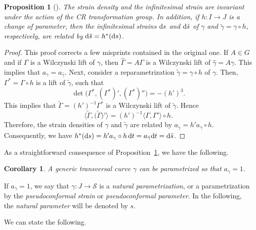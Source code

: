 \documentclass[pdftex]{sigma}
\numberwithin{equation}{section}
\newtheorem{Corollary}[Theorem]{Corollary}
\newtheorem{Proposition}[Theorem]{Proposition}
 { \theoremstyle{definition}
\newtheorem{Definition}[Theorem]{Definition}
\newtheorem{Note}[Theorem]{Note}
\newtheorem{Example}[Theorem]{Example}
\newtheorem{Remark}[Theorem]{Remark} }
\def\S{\mathcal{S}}
\def\S{\mathcal{S}}
\begin{document}
\begin{Proposition}[\cite{MNS-Kharkiv}]\label{2.2.1}
The strain density and the infinitesimal strain are invariant under the action of the CR transformation group.
In addition, if $h\colon I \to J$ is a change of parameter, then the infinitesimal strains ${\rm d}s$ and ${\rm d}\tilde s$
of $\gamma$ and $\tilde \gamma=\gamma\circ h$,
respectively, are related by ${\rm d}\tilde s = h^*({\rm d}s)$.
\end{Proposition}

\begin{proof}
This proof corrects a few misprints contained in the original one.
If $A\in {G}$ and if $\Gamma$ is a Wilczynski lift of $\gamma$, then $\hat{\Gamma} = A\Gamma$ is a
Wilczynski lift of $\hat\gamma = A\gamma$. This implies that $a_\gamma = a_{\hat\gamma}$.
Next, consider a reparametrization $\tilde\gamma=\gamma\circ h$ of $\gamma$. Then, $\Gamma^*=\Gamma\circ h$
is a lift of $\tilde\gamma$, such that
\[
 \det\big(\Gamma^*,(\Gamma^*)' ,(\Gamma^*)'' \big) = -(h')^3.
\]
This implies that $\tilde\Gamma=(h')^{ -1}\Gamma^*$ is a Wilczynski lift of $\tilde\gamma$.
Hence
\[
 \big\langle\tilde\Gamma,\big(\tilde\Gamma\big)'\big\rangle
 =(h')^{ -1}\langle\Gamma,\Gamma'\rangle\circ h.
\]
Therefore, the strain densities of $\gamma$ and $\tilde\gamma$ are related by
$a_{\tilde\gamma}=h'a_\gamma\circ h$.
Consequently, we have
$h^*({\rm d}s)= h'a_\gamma\circ h \, {\rm d}t= a_{\tilde\gamma} {\rm d}t ={\rm d}\tilde s$. \end{proof}

As a straightforward consequence of Proposition~\ref{2.2.1}, we have the following.

\begin{Corollary}
A generic transversal
curve $\gamma$ can be parametrized so that $a_\gamma = 1$.
\end{Corollary}

\begin{Definition}
If $a_\gamma = 1$, we say that $\gamma \colon J \to\S$ is a \emph{natural parametrization},
or a parametrization by the {\em pseudoconformal strain} or {\em pseudoconformal parameter}.
In the following, the {\em natural parameter} will be denoted by $s$.
\end{Definition}


We can state the following.
\end{document}

